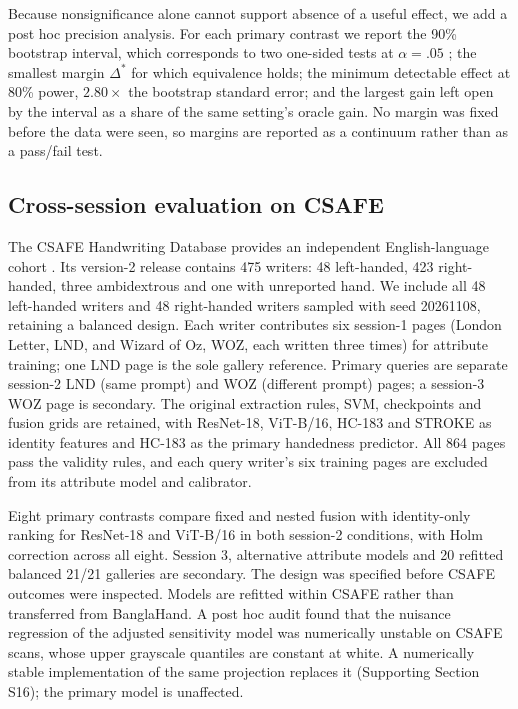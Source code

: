 \documentclass[ASNA,twocolumn]{USG}
\begin{document}
Because nonsignificance alone cannot support absence of a useful effect, we add a post hoc precision analysis. For each primary contrast we report the 90\% bootstrap interval, which corresponds to two one-sided tests at $\alpha=.05$ \cite{lakens2017equivalence}; the smallest margin $\Delta^*$ for which equivalence holds; the minimum detectable effect at 80\% power, $2.80\times$ the bootstrap standard error; and the largest gain left open by the interval as a share of the same setting's oracle gain. No margin was fixed before the data were seen, so margins are reported as a continuum rather than as a pass/fail test.

\subsection{Cross-session evaluation on CSAFE}
\label{sec:csafemethods}
The CSAFE Handwriting Database provides an independent English-language cohort \cite{crawford2020database,crawford2026csafe}. Its version-2 release contains 475 writers: 48 left-handed, 423 right-handed, three ambidextrous and one with unreported hand. We include all 48 left-handed writers and 48 right-handed writers sampled with seed 20261108, retaining a balanced design. Each writer contributes six session-1 pages (London Letter, LND, and Wizard of Oz, WOZ, each written three times) for attribute training; one LND page is the sole gallery reference. Primary queries are separate session-2 LND (same prompt) and WOZ (different prompt) pages; a session-3 WOZ page is secondary. The original extraction rules, SVM, checkpoints and fusion grids are retained, with ResNet-18, ViT-B/16, HC-183 and STROKE as identity features and HC-183 as the primary handedness predictor. All 864 pages pass the validity rules, and each query writer's six training pages are excluded from its attribute model and calibrator.

Eight primary contrasts compare fixed and nested fusion with identity-only ranking for ResNet-18 and ViT-B/16 in both session-2 conditions, with Holm correction across all eight. Session 3, alternative attribute models and 20 refitted balanced 21/21 galleries are secondary. The design was specified before CSAFE outcomes were inspected. Models are refitted within CSAFE rather than transferred from BanglaHand. A post hoc audit found that the nuisance regression of the adjusted sensitivity model was numerically unstable on CSAFE scans, whose upper grayscale quantiles are constant at white. A numerically stable implementation of the same projection replaces it (Supporting Section S16); the primary model is unaffected.
\end{document}
